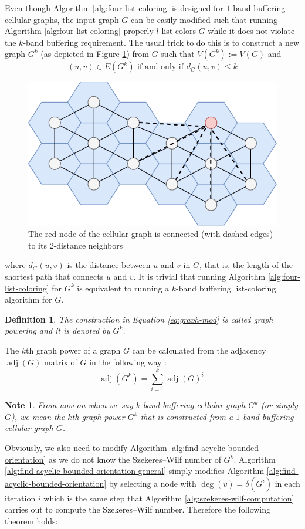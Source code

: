 \documentclass[a4paper, 12pt]{article}
\newtheorem{defin}[lem]{Definition}
\newtheorem{note}[lem]{Note}
\newcommand{\adj}{\mathop{\mathrm{adj}}}
\begin{document}
Even though Algorithm \ref{alg:four-list-coloring} is designed for $1$-band buffering cellular graphs, the input graph $G$ can be easily modified such that running Algorithm \ref{alg:four-list-coloring} properly $l$-list-colors $G$ while it does not violate the $k$-band buffering requirement. The usual trick to do this is to construct a new graph $G^k$ (as depicted in Figure \ref{fig:cellular-graph-extension}) from $G$ such that $V(G^k) := V(G)$ and
\begin{equation}\label{eq:graph-mod}
(u,v) \in E(G^k) \text{ if and only if } d_{G}(u,v) \leqslant k
\end{equation}
\begin{figure}[!h]
\centering
\includegraphics[scale=1]{figures/cellular_graph_extension.pdf}
\caption{The red node of the cellular graph is connected (with dashed edges) to its $2$-distance neighbors}\label{fig:cellular-graph-extension}
\end{figure}
where $d_{G}(u,v)$ is the distance between $u$ and $v$ in $G$, that is, the length of the shortest path that connects $u$ and $v$. It is trivial that running Algorithm \ref{alg:four-list-coloring} for $G^k$ is equivalent to running a $k$-band buffering list-coloring algorithm  for $G$.

\begin{defin} The construction in Equation \ref{eq:graph-mod} is called graph powering and it is denoted by $G^k$. 
\end{defin}

The $k$th graph power of a graph $G$ can be calculated from the adjacency $\adj(G)$ matrix of $G$ in the following way \cite{power}:
$$
\adj(G^k) = \sum^k_{i=1} \adj(G)^i.
$$
\begin{note} From now on when we say $k$-band buffering cellular graph $G^k$ (or simply $G$), we mean the $k$th graph power $G^k$ that is constructed from a $1$-band buffering cellular graph $G$.
\end{note}
Obviously, we also need to modify Algorithm \ref{alg:find-acyclic-bounded-orientation} as we do not know the Szekeres\---Wilf number of $G^k$. Algorithm \ref{alg:find-acyclic-bounded-orientation-general} simply modifies Algorithm \ref{alg:find-acyclic-bounded-orientation} by selecting a node with $\deg(v) = \delta(G^i)$ in each iteration $i$ which is the same step that Algorithm \ref{alg:szekeres-wilf-computation} carries out to compute the Szekeres\---Wilf number. Therefore the following theorem holds:
\end{document}
